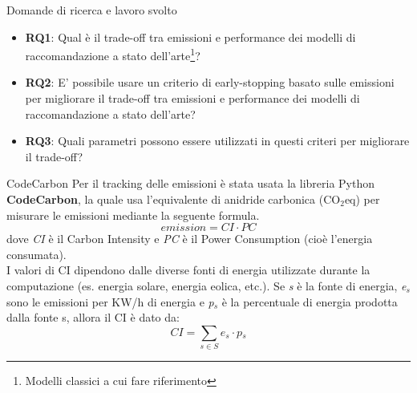 \begin{frame}{Domande di ricerca e lavoro svolto}
    \begin{itemize}
        \item \textbf{RQ1}: Qual è il trade-off tra emissioni e performance dei modelli di raccomandazione a stato dell'arte\footnote{Modelli classici a cui fare riferimento}{?}
        \item \textbf{RQ2}: E’ possibile usare un criterio di early-stopping basato sulle emissioni per migliorare il trade-off tra emissioni e performance dei modelli di raccomandazione a stato dell’arte?
        \item \textbf{RQ3}: Quali parametri possono essere utilizzati in questi criteri per migliorare il trade-off?
    \end{itemize}
\end{frame}

\begin{frame}{CodeCarbon}
    Per il tracking delle emissioni è stata usata la libreria Python \textbf{CodeCarbon}, la quale usa l'equivalente di anidride carbonica (CO$_2$eq) per misurare le emissioni mediante la seguente formula.\\
    \begin{equation}
        \textit{emission} = \textit{CI}  \cdot \textit{PC}
    \end{equation} dove \textit{CI} è il Carbon Intensity e \textit{PC} è il Power Consumption (cioè l'energia consumata).\\
    
    I valori di CI dipendono dalle diverse fonti di energia utilizzate durante la computazione 
    (es. energia solare, energia eolica, etc.). Se \textit{s} è la fonte di energia,  \textit{e$_s$} sono le emissioni per KW/h di energia e \textit{p$_s$}  è la percentuale di energia prodotta dalla fonte s, allora il CI è dato da:
    \begin{equation}
        \textit{CI} = \sum_{s \in S} \textit{e$_s$} \cdot \textit{p$_s$}
    \end{equation}
    
\end{frame}
